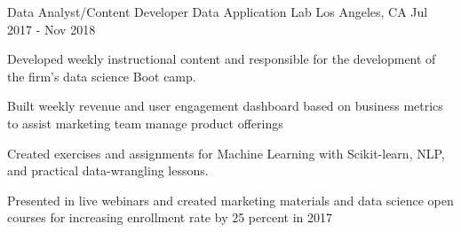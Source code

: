 \begin{cventries}
  \cventry
    {Data Analyst/Content Developer} %
    {Data Application Lab} %
    {Los Angeles, CA} %
    {Jul 2017 - Nov 2018} %
    {
      \begin{cvitems} %
        \item {Developed weekly instructional content and responsible for the development of the firm’s data science Boot camp.}
        \item {Built weekly revenue and user engagement dashboard based on business metrics to assist marketing team manage product offerings}
        \item {Created exercises and assignments for Machine Learning with Scikit-learn, NLP, and practical data-wrangling lessons.}
        \item {Presented in live webinars and created marketing materials and data science open courses for increasing enrollment rate by 25 percent in 2017}
      \end{cvitems}
    }
\end{cventries}
